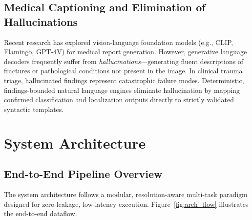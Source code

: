 \documentclass[12pt, a4paper]{report}
\begin{document}
\section{Medical Captioning and Elimination of Hallucinations}
Recent research has explored vision-language foundation models (e.g., CLIP, Flamingo, GPT-4V) for medical report generation. However, generative language decoders frequently suffer from \textit{hallucinations}—generating fluent descriptions of fractures or pathological conditions not present in the image. In clinical trauma triage, hallucinated findings represent catastrophic failure modes. Deterministic, findings-bounded natural language engines eliminate hallucination by mapping confirmed classification and localization outputs directly to strictly validated syntactic templates.

\newpage
\chapter{System Architecture}

\section{End-to-End Pipeline Overview}
The system architecture follows a modular, resolution-aware multi-task paradigm designed for zero-leakage, low-latency execution. Figure~\ref{fig:arch_flow} illustrates the end-to-end dataflow.
\end{document}
